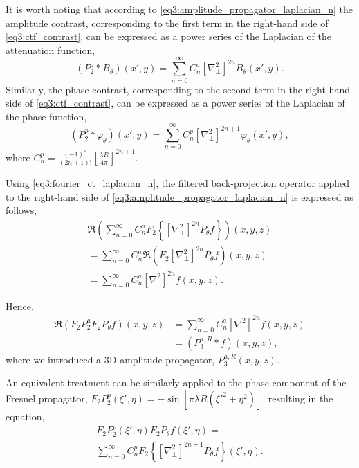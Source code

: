 \documentclass[twocolumn, switch]{article} %
\begin{document}
It is worth noting that according to \cref{eq3:amplitude_propagator_laplacian_n} the amplitude contrast, corresponding to the first term in the right-hand side of \cref{eq3:ctf_contrast}, can be expressed as a power series of the Laplacian of the attenuation function,
\[(P_2^a * {B_\theta })\left( {x',y} \right) = \sum\limits_{n = 0}^\infty  {C_n^a{{\left[ {\nabla _ \bot ^2} \right]}^{2n}}{B_\theta }(x',y)} .\]
Similarly, the phase contrast, corresponding to the second term in the right-hand side of \cref{eq3:ctf_contrast}, can be expressed as a power series of the Laplacian of the phase function,
\[(P_2^p * {\varphi _\theta })\left( {x',y} \right) = \sum\limits_{n = 0}^\infty  {C_n^p{{\left[ {\nabla _ \bot ^2} \right]}^{2n + 1}}{\varphi _\theta }(x',y)} ,\]
where $C_n^p = \frac{{{{\left( { - 1} \right)}^n}}}{{\left( {2n + 1} \right)!}}{\left[ {\frac{{\lambda R}}{{4\pi }}} \right]^{2n + 1}}$.

Using \cref{eq3:fourier_ct_laplacian_n}, the filtered back-projection operator applied to the right-hand side of \cref{eq3:amplitude_propagator_laplacian_n} is expressed as follows,
\begin{multline}
    \Re \left( {\sum\limits_{n = 0}^\infty  {C_n^a{F_2}\left\{ {{{\left[ {\nabla _ \bot ^2} \right]}^{2n}}{P_\theta }f} \right\}} } \right)\left( {x,y,z} \right) \\
    =\sum\limits_{n = 0}^\infty  {C_n^a\Re \left( {{F_2}{{\left[ {\nabla _ \bot ^2} \right]}^{2n}}{P_\theta }f} \right)(x,y,z)} \\
    = \sum\limits_{n = 0}^\infty  {C_n^a{{\left[ {{\nabla ^2}} \right]}^{2n}}} f(x,y,z).
\end{multline}

Hence,
\begin{equation}
    \label{eq3:fbp_amplitude}
    \begin{split}       
    \Re \left( {{F_2}P_2^a{F_2}{P_\theta }f} \right)\left( {x,y,z} \right) & = \sum\limits_{n = 0}^\infty  {C_n^a{{\left[ {{\nabla ^2}} \right]}^{2n}}} f(x,y,z) \\ 
    & = (P_3^{a,R} * f)\left( {x,y,z} \right),
    \end{split}    
\end{equation}
where we introduced a 3D amplitude propagator, $P_3^{a,R}(x,y,z)$.

An equivalent treatment can be similarly applied to the phase component of the Fresnel propagator,  ${F_2}P_2^p\left( {\xi ',\eta } \right) =  - \sin \left[ {\pi \lambda R\left( {{{\xi '}^2} + {\eta ^2}} \right)} \right]$, resulting in the equation,
\begin{multline}
    \label{eq3:phase_propagator_laplacian_n}
    {F_2}P_2^p\left( {\xi ',\eta } \right){F_2}{P_\theta }f\left( {\xi ',\eta } \right) = \\\sum\limits_{n = 0}^\infty  {C_n^p{F_2}\left\{ {{{\left[ {\nabla _ \bot ^2} \right]}^{2n + 1}}{P_\theta }f} \right\}\left( {\xi ',\eta } \right)}.
\end{multline}
\end{document}
